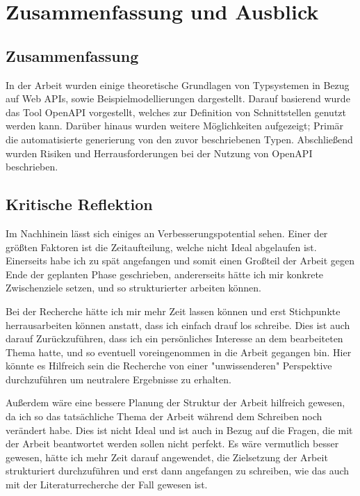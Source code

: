 
\section{Zusammenfassung und Ausblick}

\subsection{Zusammenfassung}

In der Arbeit wurden einige theoretische Grundlagen von Typsystemen in Bezug auf Web APIs, 
sowie Beispielmodellierungen dargestellt.
Darauf basierend wurde das Tool OpenAPI vorgestellt, welches zur Definition von Schnittstellen genutzt werden kann.
Darüber hinaus wurden weitere Möglichkeiten aufgezeigt; Primär die automatisierte generierung von den
zuvor beschriebenen Typen.
Abschließend wurden Risiken und Herrausforderungen bei der Nutzung von OpenAPI beschrieben.

\subsection{Kritische Reflektion} 

Im Nachhinein lässt sich einiges an Verbesserungspotential sehen. Einer der größten Faktoren ist die Zeitaufteilung,
welche nicht Ideal abgelaufen ist. Einerseits habe ich zu spät angefangen und somit einen Großteil der Arbeit gegen
Ende der geplanten Phase geschrieben, andererseits hätte ich mir konkrete Zwischenziele setzen, und so strukturierter
arbeiten können.

Bei der Recherche hätte ich mir mehr Zeit lassen können und erst Stichpunkte herrausarbeiten können anstatt, dass ich
einfach drauf los schreibe. Dies ist auch darauf Zurückzuführen, dass ich ein persönliches Interesse an dem
bearbeiteten Thema hatte, und so eventuell voreingenommen in die Arbeit gegangen bin.
Hier könnte es Hilfreich sein die Recherche von einer "unwissenderen" Perspektive durchzuführen um neutralere
Ergebnisse zu erhalten.

Außerdem wäre eine bessere Planung der Struktur der Arbeit hilfreich gewesen, da ich so das tatsächliche Thema der
Arbeit während dem Schreiben noch verändert habe. Dies ist nicht Ideal und ist auch in Bezug auf die Fragen,
die mit der Arbeit beantwortet werden sollen nicht perfekt. Es wäre vermutlich besser gewesen, 
hätte ich mehr Zeit darauf angewendet, die Zielsetzung der Arbeit strukturiert durchzuführen und erst dann angefangen
zu schreiben, wie das auch mit der Literaturrecherche der Fall gewesen ist.

